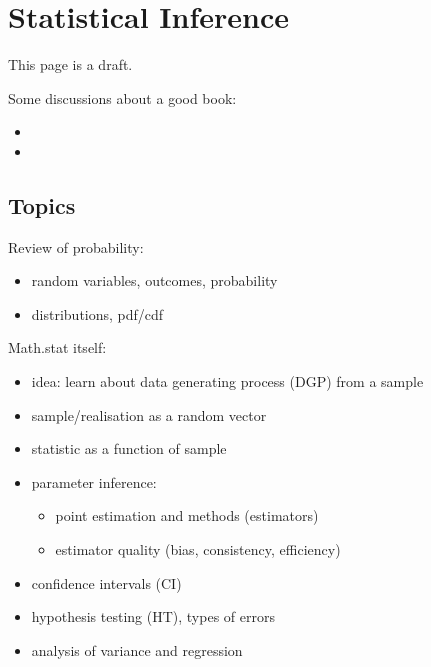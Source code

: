 \documentclass[letterpaper,10pt,english]{sphinxmanual}
\begin{document}
\section{Statistical Inference}
\label{\detokenize{textbook/statistics:statistical-inference}}\label{\detokenize{textbook/statistics::doc}}
This page is a draft.

Some discussions about a good book:
\begin{itemize}
\item {} 

\item {} 

\end{itemize}


\subsection{Topics}
\label{\detokenize{textbook/statistics:topics}}
Review of probability:
\begin{itemize}
\item {} 
random variables, outcomes, probability

\item {} 
distributions, pdf/cdf

\end{itemize}

Math.stat itself:
\begin{itemize}
\item {} 
idea: learn about data generating process (DGP) from a sample

\item {} 
sample/realisation as a random vector

\item {} 
statistic as a function of sample

\item {} 
parameter inference:
\begin{itemize}
\item {} 
point estimation and methods (estimators)

\item {} 
estimator quality (bias, consistency, efficiency)

\end{itemize}

\item {} 
confidence intervals (CI)

\item {} 
hypothesis testing (HT), types of errors

\item {} 
analysis of variance and regression

\end{itemize}
\end{document}
